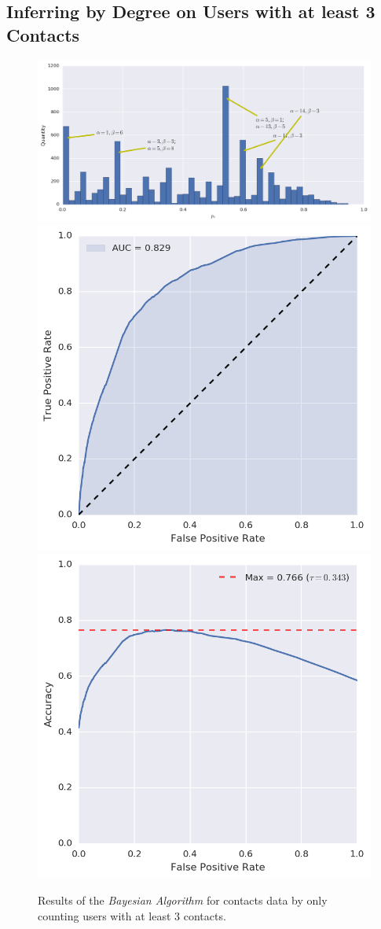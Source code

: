 \subsection{Inferring by Degree on Users with at least 3 Contacts}

\begin{figure}[tbh]
\centering
\includegraphics[width=\textwidth, height=.25\textheight, keepaspectratio]{figures/bayes/3contacts/hist_contacts.png}
\includegraphics[width=.49\textwidth, height=.25\textheight, keepaspectratio]{figures/bayes/3contacts/roc_contacts.png}
\includegraphics[width=.49\textwidth, height=.25\textheight, keepaspectratio]{figures/bayes/3contacts/accuracy_contacts.png}
\caption{Results of the \emph{Bayesian Algorithm} for contacts data by only counting users with at least 3 contacts.}
\label{fig:bayes_contacts_least3}
\end{figure}

